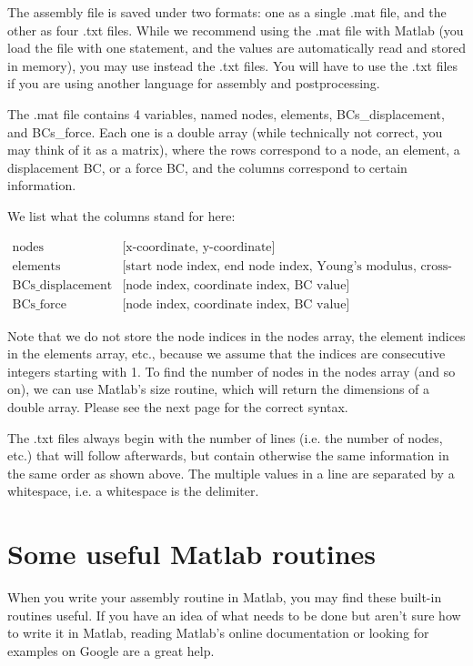 \documentclass[oneside, english, reqno]{amsart}
\theoremstyle{plain}
\theoremstyle{plain}
\theoremstyle{plain}
\theoremstyle{plain}
\theoremstyle{definition}
\theoremstyle{definition}
\theoremstyle{definition}
\numberwithin{equation}{section}
\begin{document}
The assembly file is saved under two formats: one as a single .mat file, and the other as four .txt files. While we recommend using the .mat file with Matlab (you load the file with one statement, and the values are automatically read and stored in memory), you may use instead the .txt files. You will have to use the .txt files if you are using another language for assembly and postprocessing.

The .mat file contains 4 variables, named nodes, elements, BCs\_displacement, and BCs\_force. Each one is a double array (while technically not correct, you may think of it as a matrix), where the rows correspond to a node, an element, a displacement BC, or a force BC, and the columns correspond to certain information.

We list what the columns stand for here:

\begin{equation*}
		\begin{array}{ll}
				\mbox{nodes} & \mbox{[x-coordinate, y-coordinate]} \\[6pt]
				\mbox{elements} & \mbox{[start node index, end node index, Young's modulus, cross-sectional area]} \\[6pt]
				\mbox{BCs\_displacement} & \mbox{[node index, coordinate index, BC value]} \\[6pt]
				\mbox{BCs\_force} & \mbox{[node index, coordinate index, BC value]}
		\end{array}
\end{equation*} \vspace{6pt}

Note that we do not store the node indices in the nodes array, the element indices in the elements array, etc., because we assume that the indices are consecutive integers starting with 1. To find the number of nodes in the nodes array (and so on), we can use Matlab's size routine, which will return the dimensions of a double array. Please see the next page for the correct syntax.

The .txt files always begin with the number of lines (i.e. the number of nodes, etc.) that will follow afterwards, but contain otherwise the same information in the same order as shown above. The multiple values in a line are separated by a whitespace, i.e. a whitespace is the delimiter.


\newpage
\section{Some useful Matlab routines}
\label{sec:2}
When you write your assembly routine in Matlab, you may find these built-in routines useful. If you have an idea of what needs to be done but aren't sure how to write it in Matlab, reading Matlab's online documentation or looking for examples on Google are a great help. \vspace{15pt}
\end{document}
